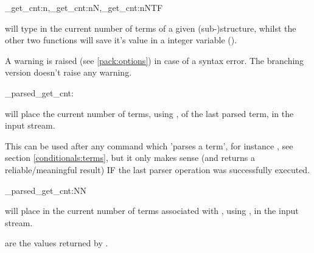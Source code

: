 \documentclass[10pt]{article}
\begin{document}
\begin{codedescribe}{\starray_get_cnt:n,\starray_get_cnt:nN,\starray_get_cnt:nNTF}
\begin{codesyntax}%
\end{codesyntax}
\end{codedescribe}
 will type in the current number of terms of a given (sub-)structure, whilst the other two functions will save it's value in a integer variable ().
\begin{tsremark}
A warning is raised (see \ref{pack:options}) in case of a  syntax error. The branching version doesn't raise any warning.
\end{tsremark}

\begin{codedescribe}[code,EXP,new=2023/05/20]{\starray_parsed_get_cnt:}
\begin{codesyntax}%
\end{codesyntax}
 will place the current number of terms, using , of the last parsed term, in the input stream.
\end{codedescribe}
\begin{tsremark}
This can be used after any command which 'parses a term', for instance , see section \ref{conditionals:terms}, but it only makes sense (and returns a reliable/meaningful result) IF the last parser operation was successfully executed.
\end{tsremark}

\begin{codedescribe}[code,EXP,new=2023/11/28]{\starray_parsed_get_cnt:NN}
\begin{codesyntax}%
\end{codesyntax}
 will place in the current number of terms associated with ,  using , in the input stream.
\end{codedescribe}
\begin{tsremark}
 are the values returned by .
\end{tsremark}
\end{document}
